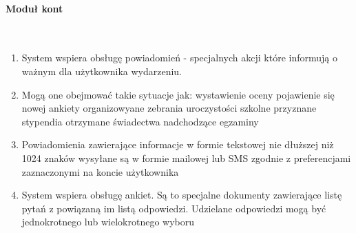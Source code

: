 \documentclass{article}
\begin{document}
\paragraph{Moduł kont} \mbox{}\\
\begin{enumerate}
	\item System wspiera obsługę powiadomień - specjalnych akcji które informują o ważnym dla użytkownika wydarzeniu. \item Mogą one obejmować takie sytuacje jak:
	\subitem wystawienie oceny
	\subitem pojawienie się nowej ankiety
	\subitem organizowyane zebrania
	\subitem uroczystości szkolne
	\subitem przyznane stypendia
	\subitem otrzymane świadectwa
	\subitem nadchodzące egzaminy
	\item Powiadomienia zawierające informacje w formie tekstowej nie dłuższej niż 1024 znaków wysyłane są w formie mailowej lub SMS zgodnie z preferencjami zaznaczonymi na koncie użytkownika
	\item System wspiera obsługę ankiet. Są to specjalne dokumenty zawierające listę pytań z powiązaną im listą odpowiedzi. Udzielane odpowiedzi mogą być jednokrotnego lub wielokrotnego wyboru
	
\end{enumerate}
\end{document}
